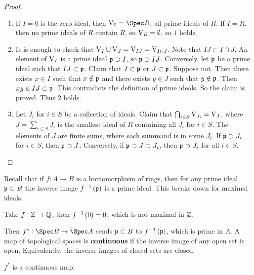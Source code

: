\begin{proof}
\hfill
\begin{enumerate}
\item If $ I = 0 $ is the zero ideal, then $ \V_0 = \Spec R $, all prime ideals of $ R $. If $ I = R $, then no prime ideals of $ R $ contain $ R $, so $ \mathrm{V}_R = \emptyset $, so $ 1 $ holds.
\item It is enough to check that $ \mathrm{V}_I \cup \mathrm{V}_J = \mathrm{V}_{IJ} = \mathrm{V}_{I \cap J} $. Note that $ IJ \subset I \cap J $. An element of $ \mathrm{V}_I $ is a prime ideal $ \mathfrak{p} \supset I $, so $ \mathfrak{p} \supset IJ $. Conversely, let $ \mathfrak{p} $ be a prime ideal such that $ IJ \subset \mathfrak{p} $. Claim that $ I \subset \mathfrak{p} $ or $ J \subset \mathfrak{p} $. Suppose not. Then there exists $ x \in I $ such that $ x \notin \mathfrak{p} $ and there exists $ y \in J $ such that $ y \notin \mathfrak{p} $. Then $ xy \in IJ \subset \mathfrak{p} $. This contradicts the definition of prime ideals. So the claim is proved. Thus $ 2 $ holds.
\item Let $ J_i $ for $ i \in S $ be a collection of ideals. Claim that $ \bigcap_{i \in S} \mathrm{V}_{J_i} = \mathrm{V}_J $, where $ J = \sum_{i \in S} J_i $ is the smallest ideal of $ R $ containing all $ J_i $ for $ i \in S $. The elements of $ J $ are finite sums, where each summand is in some $ J_i $. If $ \mathfrak{p} \supset J_i $ for $ i \in S $, then $ \mathfrak{p} \supset J $. Conversely, if $ \mathfrak{p} \supset J \supset J_i $, then $ \mathfrak{p} \supset J_i $ for all $ i \in S $.
\end{enumerate}
\end{proof}

Recall that if $ f : A \to B $ is a homomorphism of rings, then for any prime ideal $ \mathfrak{p} \subset B $ the inverse image $ f^{-1}\br{\ppp} $ is a prime ideal. This breaks down for maximal ideals.

\begin{example*}
Take $ f : \mathbb{Z} \to \mathbb{Q} $, then $ f^{-1}\br{0} = 0 $, which is not maximal in $ \mathbb{Z} $.
\end{example*}

Then $ f^* : \Spec B \to \Spec A $ sends $ \mathfrak{p} \subset B $ to $ f^{-1}\br{\ppp} $, which is prime in $ A $. A map of topological spaces is \textbf{continuous} if the inverse image of any open set is open. Equivalently, the inverse images of closed sets are closed.

\begin{proposition}
$ f^* $ is a continuous map.
\end{proposition}

